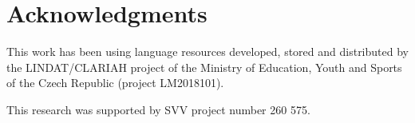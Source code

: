 \documentclass[conference]{IEEEtran}
\begin{document}
\section*{Acknowledgments}

This work has been using language resources developed, stored and distributed by
the LINDAT/CLARIAH project of the Ministry of Education, Youth and Sports of the
Czech Republic (project LM2018101).

This research was supported by SVV project number 260 575.



\end{document}
